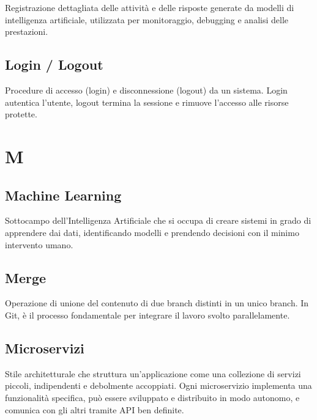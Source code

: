 \documentclass[a4paper, 11pt, oneside]{scrartcl} %
\begin{document}
Registrazione dettagliata delle attività e delle risposte generate da modelli di intelligenza artificiale, utilizzata per monitoraggio, debugging e analisi delle prestazioni.

\vspace{0.5cm}

\subsection*{Login / Logout}


Procedure di accesso (login) e disconnessione (logout) da un sistema. Login autentica l'utente, logout termina la sessione e rimuove l'accesso alle risorse protette.

\vspace{0.5cm}



\section*{M}


\subsection*{Machine Learning}
Sottocampo dell'Intelligenza Artificiale che si occupa di creare sistemi in grado di apprendere dai dati, identificando modelli e prendendo decisioni con il minimo intervento umano.
\vspace{0.5cm}

\subsection*{Merge}
Operazione di unione del contenuto di due branch distinti in un unico branch. In Git, è il processo fondamentale per integrare il lavoro svolto parallelamente.
\vspace{0.5cm}

\subsection*{Microservizi}
Stile architetturale che struttura un'applicazione come una collezione di servizi piccoli, indipendenti e debolmente accoppiati. Ogni microservizio implementa una funzionalità specifica, può essere sviluppato e distribuito in modo autonomo, e comunica con gli altri tramite API ben definite.
\vspace{0.5cm}
\end{document}
